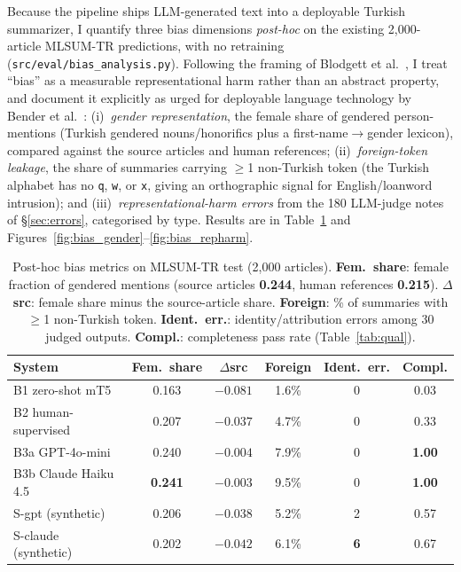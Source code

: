 \documentclass{llncs}
\begin{document}
Because the pipeline ships LLM-generated text into a deployable Turkish
summarizer, I quantify three bias dimensions \emph{post-hoc} on the existing
2{,}000-article MLSUM-TR predictions, with no retraining
(\texttt{src/eval/bias\_analysis.py}). Following the framing of Blodgett et
al.~\cite{blodgett2020bias}, I treat ``bias'' as a measurable representational
harm rather than an abstract property, and document it explicitly as urged for
deployable language technology by Bender et al.~\cite{bender2021parrots}:
(i)~\emph{gender representation}, the female share of gendered person-mentions
(Turkish gendered nouns/honorifics plus a first-name$\rightarrow$gender lexicon),
compared against the source articles and human references;
(ii)~\emph{foreign-token leakage}, the share of summaries carrying $\geq$1
non-Turkish token (the Turkish alphabet has no \texttt{q}, \texttt{w}, or
\texttt{x}, giving an orthographic signal for English/loanword intrusion); and
(iii)~\emph{representational-harm errors} from the 180 LLM-judge notes of
\S\ref{sec:errors}, categorised by type. Results are in Table~\ref{tab:bias} and
Figures~\ref{fig:bias_gender}--\ref{fig:bias_repharm}.

\begin{table}[!ht]
\centering
\caption{Post-hoc bias metrics on MLSUM-TR test (2{,}000 articles). \textbf{Fem.\
share}: female fraction of gendered mentions (source articles \textbf{0.244},
human references \textbf{0.215}). \textbf{$\Delta$src}: female share minus the
source-article share. \textbf{Foreign}: \% of summaries with $\geq$1
non-Turkish token. \textbf{Ident.\ err.}: identity/attribution errors among 30
judged outputs. \textbf{Compl.}: completeness pass rate (Table~\ref{tab:qual}).}
\label{tab:bias}
\small
\begin{tabular}{lccccc}
\toprule
System & Fem.\ share & $\Delta$src & Foreign & Ident.\ err. & Compl. \\
\midrule
B1 zero-shot mT5     & 0.163 & $-0.081$ & 1.6\% & 0 & 0.03 \\
B2 human-supervised  & 0.207 & $-0.037$ & 4.7\% & 0 & 0.33 \\
B3a GPT-4o-mini      & 0.240 & $-0.004$ & 7.9\% & 0 & \textbf{1.00} \\
B3b Claude Haiku 4.5 & \textbf{0.241} & $\mathbf{-0.003}$ & 9.5\% & 0 & \textbf{1.00} \\
S-gpt (synthetic)    & 0.206 & $-0.038$ & 5.2\% & 2 & 0.57 \\
S-claude (synthetic) & 0.202 & $-0.042$ & 6.1\% & \textbf{6} & 0.67 \\
\bottomrule
\end{tabular}
\end{table}
\end{document}
